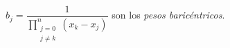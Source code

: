 \begin{frame}
\begin{definition}
\begin{columns}
\begin{column}{.45\paperwidth}
\begin{itemize}
					      \begin{math}
						      b_{j}=
						      \dfrac{1}{
							      \prod\limits_{\substack{j=0\\j\neq k}}^{n}
							      \left(
							      x_{k}-x_{j}
							      \right)
						      }
					      \end{math}
					      son los \emph{pesos baricéntricos}.
				\end{itemize}
			\end{column}
		\end{columns}
	\end{definition}
\end{frame}